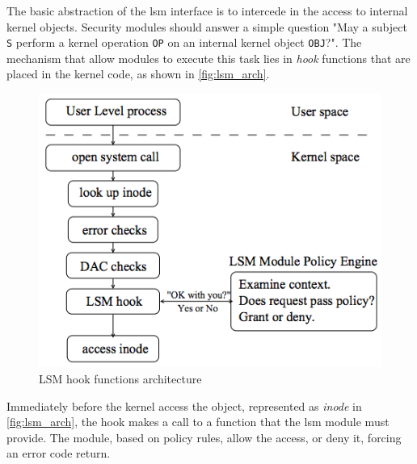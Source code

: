 The basic abstraction of the \gls{lsm} interface is to intercede in the access to internal kernel objects. Security modules should answer a simple question "May a subject \texttt{S} perform a kernel operation \texttt{OP} on an internal kernel object \texttt{OBJ}?". The mechanism that allow modules to execute this task lies in \textit{hook} functions that are placed in the kernel code, as shown in \autoref{fig:lsm_arch}.

\begin{figure}[htbp]
 \centering
 \includegraphics[scale=0.5]{images/LSM_architecture.png}
 \caption{LSM hook functions architecture}
 \label{fig:lsm_arch}
\end{figure}

Immediately before the kernel access the object, represented as \textit{inode} in \autoref{fig:lsm_arch}, the hook makes a call to a function that the \gls{lsm} module must provide. The module, based on policy rules, allow the access, or deny it, forcing an error code return.
